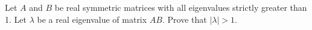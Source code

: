 \documentclass{article}
\begin{document}
\setlength{\parindent}{0pt}
Let \( A \) and \( B \) be real symmetric matrices with all eigenvalues strictly greater than 1. Let \( \lambda \) be a real eigenvalue of matrix \( AB \). Prove that \( |\lambda| > 1 \).


\end{document}
